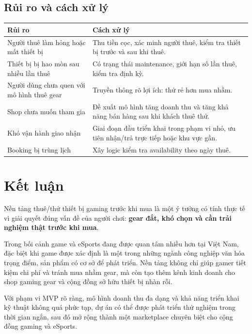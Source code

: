 \subsection{Rủi ro và cách xử lý}

\begin{longtable}{>{\raggedright\arraybackslash}p{} >{\raggedright\arraybackslash}p{}}
\toprule
\textbf{Rủi ro} & \textbf{Cách xử lý} \\
\midrule
\endhead
Người thuê làm hỏng hoặc mất thiết bị & Thu tiền cọc, xác minh người thuê, kiểm tra thiết bị trước và sau khi thuê. \\
Thiết bị bị hao mòn sau nhiều lần thuê & Có trạng thái maintenance, giới hạn số lần thuê, kiểm tra định kỳ. \\
Người dùng chưa quen với mô hình thuê gear & Truyền thông rõ lợi ích: thử rẻ hơn mua nhầm. \\
Shop chưa muốn tham gia & Đề xuất mô hình tăng doanh thu và tăng khả năng bán hàng sau khi khách thuê thử. \\
Khó vận hành giao nhận & Giai đoạn đầu triển khai trong phạm vi nhỏ, ưu tiên nhận/trả trực tiếp hoặc khu vực gần. \\
Booking bị trùng lịch & Xây logic kiểm tra availability theo ngày thuê. \\
\bottomrule
\end{longtable}

\section{Kết luận}

Nền tảng thuê/thử thiết bị gaming trước khi mua là một ý tưởng có tính thực tế vì giải quyết đúng vấn đề của người chơi: \textbf{gear đắt, khó chọn và cần trải nghiệm thật trước khi mua}.

Trong bối cảnh game và eSports đang được quan tâm nhiều hơn tại Việt Nam, đặc biệt khi game được xác định là một trong những ngành công nghiệp văn hóa trọng điểm, sản phẩm có cơ sở để phát triển. Nền tảng không chỉ giúp gamer tiết kiệm chi phí và tránh mua nhầm gear, mà còn tạo thêm kênh kinh doanh cho shop gaming gear và cộng đồng sở hữu thiết bị nhàn rỗi.

Với phạm vi MVP rõ ràng, mô hình doanh thu đa dạng và khả năng triển khai kỹ thuật không quá phức tạp, dự án có thể được phát triển thử nghiệm trong thời gian ngắn, sau đó mở rộng thành một marketplace chuyên biệt cho cộng đồng gaming và eSports.
